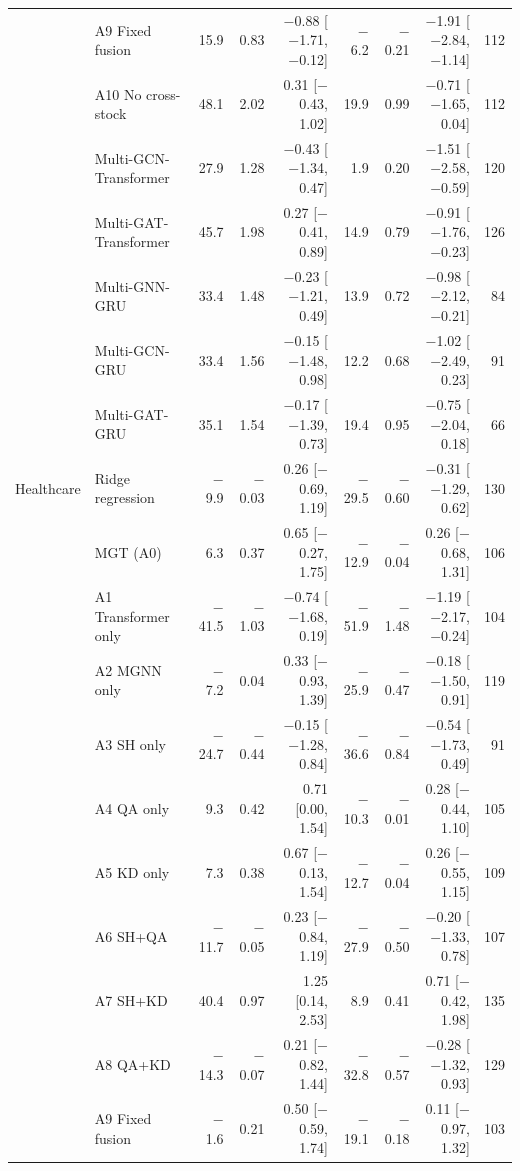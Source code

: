 \begin{table}[!t]
{\begin{tabular}{llrrrrrrr}
 & A9 Fixed fusion & 15.9 & 0.83 & $-$0.88 [$-$1.71, $-$0.12] & $-$6.2 & $-$0.21 & $-$1.91 [$-$2.84, $-$1.14] & 112 \\
 & A10 No cross-stock & 48.1 & 2.02 & 0.31 [$-$0.43, 1.02] & 19.9 & 0.99 & $-$0.71 [$-$1.65, 0.04] & 112 \\
 & Multi-GCN-Transformer & 27.9 & 1.28 & $-$0.43 [$-$1.34, 0.47] & 1.9 & 0.20 & $-$1.51 [$-$2.58, $-$0.59] & 120 \\
 & Multi-GAT-Transformer & 45.7 & 1.98 & 0.27 [$-$0.41, 0.89] & 14.9 & 0.79 & $-$0.91 [$-$1.76, $-$0.23] & 126 \\
 & Multi-GNN-GRU & 33.4 & 1.48 & $-$0.23 [$-$1.21, 0.49] & 13.9 & 0.72 & $-$0.98 [$-$2.12, $-$0.21] & 84 \\
 & Multi-GCN-GRU & 33.4 & 1.56 & $-$0.15 [$-$1.48, 0.98] & 12.2 & 0.68 & $-$1.02 [$-$2.49, 0.23] & 91 \\
 & Multi-GAT-GRU & 35.1 & 1.54 & $-$0.17 [$-$1.39, 0.73] & 19.4 & 0.95 & $-$0.75 [$-$2.04, 0.18] & 66 \\
\midrule
Healthcare & Ridge regression & $-$9.9 & $-$0.03 & 0.26 [$-$0.69, 1.19] & $-$29.5 & $-$0.60 & $-$0.31 [$-$1.29, 0.62] & 130 \\
 & MGT (A0) & 6.3 & 0.37 & 0.65 [$-$0.27, 1.75] & $-$12.9 & $-$0.04 & 0.26 [$-$0.68, 1.31] & 106 \\
 & A1 Transformer only & $-$41.5 & $-$1.03 & $-$0.74 [$-$1.68, 0.19] & $-$51.9 & $-$1.48 & $-$1.19 [$-$2.17, $-$0.24] & 104 \\
 & A2 MGNN only & $-$7.2 & 0.04 & 0.33 [$-$0.93, 1.39] & $-$25.9 & $-$0.47 & $-$0.18 [$-$1.50, 0.91] & 119 \\
 & A3 SH only & $-$24.7 & $-$0.44 & $-$0.15 [$-$1.28, 0.84] & $-$36.6 & $-$0.84 & $-$0.54 [$-$1.73, 0.49] & 91 \\
 & A4 QA only & 9.3 & 0.42 & 0.71 [0.00, 1.54] & $-$10.3 & $-$0.01 & 0.28 [$-$0.44, 1.10] & 105 \\
 & A5 KD only & 7.3 & 0.38 & 0.67 [$-$0.13, 1.54] & $-$12.7 & $-$0.04 & 0.26 [$-$0.55, 1.15] & 109 \\
 & A6 SH+QA & $-$11.7 & $-$0.05 & 0.23 [$-$0.84, 1.19] & $-$27.9 & $-$0.50 & $-$0.20 [$-$1.33, 0.78] & 107 \\
 & A7 SH+KD & 40.4 & 0.97 & 1.25 [0.14, 2.53] & 8.9 & 0.41 & 0.71 [$-$0.42, 1.98] & 135 \\
 & A8 QA+KD & $-$14.3 & $-$0.07 & 0.21 [$-$0.82, 1.44] & $-$32.8 & $-$0.57 & $-$0.28 [$-$1.32, 0.93] & 129 \\
 & A9 Fixed fusion & $-$1.6 & 0.21 & 0.50 [$-$0.59, 1.74] & $-$19.1 & $-$0.18 & 0.11 [$-$0.97, 1.32] & 103 \\

\end{tabular}}
\end{table}
